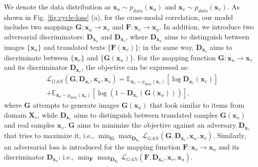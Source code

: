 \documentclass[10pt,journal,twocolumn]{IEEEtran}
\begin{document}
We denote the data distribution as $\boldsymbol x_u \sim p_{data} (\boldsymbol x_u)$ and $\boldsymbol x_v \sim p_{data} (\boldsymbol x_v)$. As shown in Fig. \ref{fig:cycle-loss} (a), for the cross-modal correlation, our model includes two mappings $\boldsymbol G: \boldsymbol x_u \rightarrow \boldsymbol x_v$ and $\boldsymbol F: \boldsymbol x_v \rightarrow \boldsymbol x_u$. In addition, we introduce two adversarial discriminators: $\boldsymbol D_{\boldsymbol x_u}$ and $\boldsymbol D_{\boldsymbol x_v}$, where $\boldsymbol D_{\boldsymbol x_u}$ aims to distinguish between images $\{\boldsymbol x_u\}$ and translated texts $\{\boldsymbol F(\boldsymbol x_v)\}$; in the same way, $\boldsymbol D_{\boldsymbol x_v}$ aims to discriminate between $\{ \boldsymbol x_v\}$ and $\{\boldsymbol G(\boldsymbol x_u)\}$. For the mapping function $\boldsymbol G: \boldsymbol x_u \rightarrow \boldsymbol x_v$ and its discriminator $\boldsymbol D_{\boldsymbol x_v}$, the objective can be expressed as:
\begin{equation}\label{eq:adversarial}
\begin{split}
     & \mathcal{L}_{GAN} (\boldsymbol G, \boldsymbol D_{\boldsymbol x_v}, \boldsymbol x_u, \boldsymbol x_v)= \mathbb{E}_{\boldsymbol x_v \sim p_{data} (\boldsymbol x_v)} [\log \boldsymbol D_{\boldsymbol x_v}(\boldsymbol x_v)] \\
     & + \mathbb{E}_{\boldsymbol x_u \sim p_{data} (\boldsymbol x_u)} [\log ( 1 - \boldsymbol D_{\boldsymbol x_v}( \boldsymbol G (\boldsymbol x_u) ))],
\end{split}
\end{equation}
where $\boldsymbol G$ attempts to generate images $\boldsymbol G (\boldsymbol x_u)$ that look similar to items from domain $\boldsymbol X_v$, while $\boldsymbol D_{\boldsymbol x_v}$ aims to distinguish between translated samples $\boldsymbol G (\boldsymbol x_u)$ and real samples $\boldsymbol x_v$. $\boldsymbol G$ aims to minimize the objective against an adversary $\boldsymbol D_{\boldsymbol x_v}$ that tries to maximize it, i.e., $\min_{\boldsymbol G} \max_{\boldsymbol D_{\boldsymbol x_v}} \mathcal{L}_{GAN} (\boldsymbol G, \boldsymbol D_{\boldsymbol x_v}, \boldsymbol x_u, \boldsymbol x_v)$. Similarly, an adversarial loss is introduced for the mapping function $\boldsymbol F: \boldsymbol x_v \rightarrow \boldsymbol x_u$ and its discriminator $\boldsymbol D_{\boldsymbol x_u}$: i.e., $\min_{\boldsymbol F} \max_{\boldsymbol D_{\boldsymbol x_u}} \mathcal{L}_{GAN} (\boldsymbol F, \boldsymbol D_{\boldsymbol x_u}, \boldsymbol x_v, \boldsymbol x_u)$.
\end{document}
